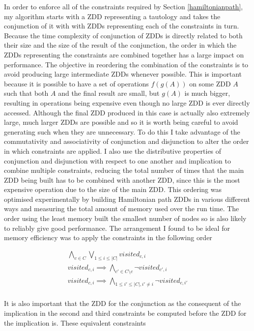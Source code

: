 \documentclass[12pt,a4paper,twoside,openright]{report}
\begin{document}
In order to enforce all of the constraints required by Section \ref{hamiltonianpath}, my algorithm starts with a ZDD representing a tautology and takes the conjunction of it with with ZDDs representing each of the constraints in turn. Because the time complexity of conjunction of ZDDs is directly related to both their size and the size of the result of the conjunction, the order in which the ZDDs representing the constraints are combined together has a large impact on performance. The objective in reordering the combination of the constraints is to avoid producing large intermediate ZDDs whenever possible. This is important because it is possible to have a set of operations $f(g(A))$ on some ZDD $A$ such that both $A$ and the final result are small, but $g(A)$ is much bigger, resulting in operations being expensive even though no large ZDD is ever directly accessed.  Although the final ZDD produced in this case is actually also extremely large, much larger ZDDs are possible and so it is worth being careful to avoid generating such when they are unnecessary. To do this I take advantage of the commutativity and associativity of conjunction and disjunction to alter the order in which constraints are applied. I also use the distributive properties of conjunction and disjunction with respect to one another and implication to combine multiple constraints, reducing the total number of times that the main ZDD being built has to be combined with another ZDD, since this is the most expensive operation due to the size of the main ZDD. This ordering was optimised experimentally by building Hamiltonian path ZDDs in various different ways and measuring the total amount of memory used over the run time. The order using the least memory built the smallest number of nodes so is also likely to reliably give good performance. The arrangement I found to be ideal for memory efficiency was to apply the constraints in the following order

\begin{gather*}
\bigwedge_{c\in C}\bigvee_{1\leq i\leq |C|} visited_{c,i} \\
visited_{c,i}\implies\bigwedge_{c'\in C\setminus c}\neg visited_{c',i} \\
visited_{c,i}\implies\bigwedge_{1\leq i'\leq |C|,i'\neq i}\neg visited_{c,i'} \\
\end{gather*}

It is also important that the ZDD for the conjunction as the consequent of the implication in the second and third constraints be computed before the ZDD for the implication is. These equivalent constraints
\end{document}
